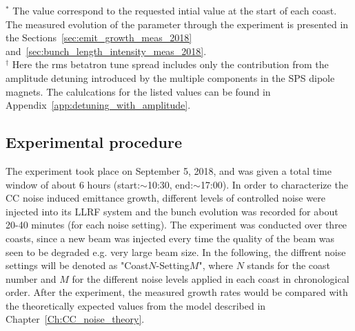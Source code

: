 \begin{table}[!hbt]
\begin{minipage}{\textwidth}
\begin{centering}
   \label{tab:machine_beam_param_2018}
   \end{centering} \footnotesize{$^\ast$ The value correspond to the requested intial value at the start of each coast. The measured evolution of the parameter through the experiment is presented in the Sections~\ref{sec:emit_growth_meas_2018} and~\ref{sec:bunch_length_intensity_meas_2018}.\\$^\dagger$ Here the rms betatron tune spread includes only the contribution from the amplitude detuning introduced by the multiple components in the SPS dipole magnets. The calulcations for the listed values can be found in Appendix~\ref{app:detuning_with_amplitude}.}
   \end{minipage}
\end{table}


\subsection{Experimental procedure}\label{sec:experimental_procedure_2018}
The experiment took place on September 5, 2018, and was given a total time window of about 6 hours (start:$\sim$10:30, end:$\sim$17:00). In order to characterize the CC noise induced emittance growth, different levels of controlled noise were injected into its LLRF system and the bunch evolution was recorded for about 20-40 minutes (for each noise setting). The experiment was conducted over three coasts, since a new beam was injected every time the quality of the beam was seen to be degraded e.g. very large beam size. In the following, the diffrent noise settings will be denoted as "Coast$N$-Setting$M$", where $N$ stands for the coast number and $M$ for the different noise levels applied in each coast in chronological order. After the experiment, the measured growth rates would be compared with the theoretically expected values from the model described in Chapter~\ref{Ch:CC_noise_theory}.

